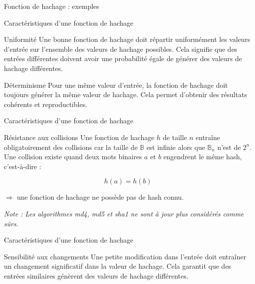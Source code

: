 \begin{frame}[fragile]{Fonction de hachage : exemples}
  
  
\end{frame}

\begin{frame}{Caractéristiques d'une fonction de hachage}
  \begin{block}{Uniformité}
    Une bonne fonction de hachage doit répartir uniformément les valeurs d'entrée sur l'ensemble des valeurs de hachage possibles. Cela signifie que des entrées différentes doivent avoir une probabilité égale de générer des valeurs de hachage différentes.
  \end{block}

  \begin{block}{Déterminisme}
    Pour une même valeur d'entrée, la fonction de hachage doit toujours générer la même valeur de hachage. Cela permet d'obtenir des résultats cohérents et reproductibles.
  \end{block}
\end{frame}

\begin{frame}{Caractéristiques d'une fonction de hachage}
  \begin{block}{Résistance aux collisions}
    Une fonction de hachage $h$ de taille $n$ entraîne obligatoirement des collisions car la taille de $\mathbb{B}$ est infinie alors que $\mathbb{B}_n$ n'est  de $2^n$.
    Une collision existe quand deux mots binaires $a$ et $b$ engendrent le même hash, c'est-à-dire :

    $$h(a) = h(b)$$

    $\Rightarrow$ une  fonction de hachage ne possède pas de hash connu.

    \begin{small}
      \textit{Note : Les algorithmes md4, md5 et sha1 ne sont à jour plus considérés comme sûrs.}
    \end{small}
  \end{block}
\end{frame}

\begin{frame}{Caractéristiques d'une fonction de hachage}
  \begin{block}{Sensibilité aux changements}
    Une petite modification dans l'entrée doit entraîner un changement significatif dans la valeur de hachage.
    Cela garantit que des entrées similaires génèrent des valeurs de hachage différentes.
  \end{block}

  
\end{frame}


